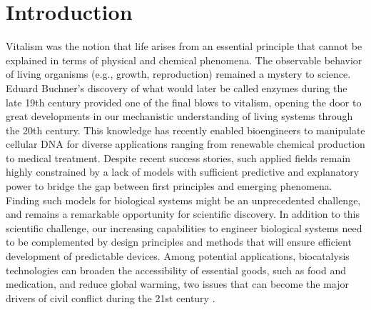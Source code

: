 \chapter*{Introduction} \label{ch:introduction}




Vitalism was the notion that life arises from an essential principle that cannot be explained in terms of physical and chemical phenomena.
The observable behavior of living organisms (e.g., growth, reproduction) remained a mystery to science.
Eduard Buchner's discovery of what would later be called enzymes during the late 19th century provided one of the final blows to vitalism, opening the door to
great developments in our mechanistic understanding of living systems through the 20th century.
This knowledge has recently enabled bioengineers to manipulate cellular DNA for diverse applications ranging from renewable chemical production to medical treatment. Despite recent success stories, such applied fields remain highly constrained by a lack of models with sufficient predictive and explanatory power to bridge the gap between first principles and emerging phenomena.
Finding such models for biological systems might be an unprecedented challenge, and remains a remarkable opportunity for scientific discovery.
In addition to this scientific challenge, our increasing capabilities to engineer biological systems need to be complemented by design principles and methods that will ensure efficient development of predictable devices. %
Among potential applications, biocatalysis technologies can broaden the accessibility of essential goods, such as food and medication, and reduce global warming, two issues that can become the major drivers of civil conflict during the 21st century \citep{barnett2007, hsiang2011, dod2015}. %

